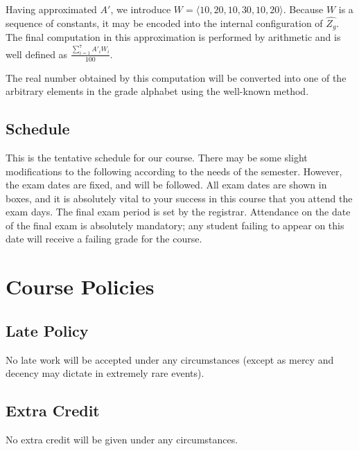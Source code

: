 \documentclass[11pt]{article}
\begin{document}
Having approximated $A'$, we introduce $W=\langle 10,
20, 10, 30, 10, 20\rangle$.  Because $W$ is
a sequence of constants, it may be encoded into the internal
configuration of $\hat{Z_g}$.  The final computation in
this approximation is performed by arithmetic and is well defined as
$\displaystyle\frac{\sum_{i=1}^7 A'_i W_i}{100}$.

The real number obtained by this computation will be converted into
one of the arbitrary elements in the grade alphabet using the
well-known method.

\subsection*{Schedule}
This is the tentative schedule for our course.  There may be some
slight modifications to the following according to the needs of the
semester. However, the exam dates are fixed, and will be followed.
All exam dates are shown in boxes, and it is absolutely vital to
your success in this course that you attend the exam days.  The final
exam period is set by the registrar.  Attendance on the date of the
final exam is absolutely mandatory; any student failing to appear on
this date will receive a failing grade for the course.




\newpage
\section*{Course Policies}

\subsection*{Late Policy}
No late work will be accepted under any circumstances (except as mercy
and decency may dictate in extremely rare events).

\subsection*{Extra Credit}
No extra credit will be given under any circumstances.
\end{document}

